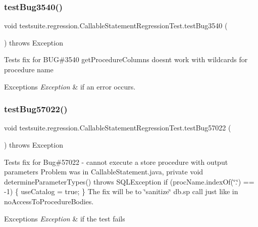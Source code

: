 \subsubsection{\texorpdfstring{test\+Bug3540()}{testBug3540()}}
{\footnotesize\ttfamily void testsuite.\+regression.\+Callable\+Statement\+Regression\+Test.\+test\+Bug3540 (\begin{DoxyParamCaption}{ }\end{DoxyParamCaption}) throws Exception}

Tests fix for B\+UG\#3540 get\+Procedure\+Columns doesn\textquotesingle{}t work with wildcards for procedure name


\begin{DoxyExceptions}{Exceptions}
{\em Exception} & if an error occurs. \\
\hline
\end{DoxyExceptions}
\mbox{\label{classtestsuite_1_1regression_1_1_callable_statement_regression_test_a9d71a6ee60ddbf67fdc1efadaca6af56}} 
\subsubsection{\texorpdfstring{test\+Bug57022()}{testBug57022()}}
{\footnotesize\ttfamily void testsuite.\+regression.\+Callable\+Statement\+Regression\+Test.\+test\+Bug57022 (\begin{DoxyParamCaption}{ }\end{DoxyParamCaption}) throws Exception}

Tests fix for Bug\#57022 -\/ cannot execute a store procedure with output parameters Problem was in Callable\+Statement.\+java, private void determine\+Parameter\+Types() throws S\+Q\+L\+Exception if (proc\+Name.\+index\+Of(\char`\"{}.\char`\"{}) == -\/1) \{ use\+Catalog = true; \} The fix will be to \char`\"{}sanitize\char`\"{} db.\+sp call just like in no\+Access\+To\+Procedure\+Bodies.


\begin{DoxyExceptions}{Exceptions}
{\em Exception} & if the test fails \\
\hline
\end{DoxyExceptions}
\mbox{\label{classtestsuite_1_1regression_1_1_callable_statement_regression_test_adf4d392882f055ca081e7af6441af0e5}} 
